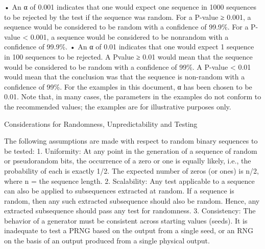 • An α of 0.001 indicates that one would expect one sequence in 1000 sequences to be rejected by the test if the sequence was random. For a P-value ≥ 0.001, a sequence would be considered to be random with a confidence of 99.9\%. For a P-value < 0.001, a sequence would be considered to be nonrandom with a confidence of 99.9\%.
• An α of 0.01 indicates that one would expect 1 sequence in 100 sequences to be rejected. A Pvalue ≥ 0.01 would mean that the sequence would be considered to be random with a confidence of 99\%. A P-value < 0.01 would mean that the conclusion was that the sequence is non-random with a confidence of 99\%.
For the examples in this document, α has been chosen to be 0.01. Note that, in many cases, the parameters in the examples do not conform to the recommended values; the examples are for illustrative purposes only. 

Considerations for Randomness, Unpredictability and Testing

The following assumptions are made with respect to random binary sequences to be tested:
1.	 Uniformity: At any point in the generation of a sequence of random or pseudorandom bits, the occurrence of a zero or one is equally likely, i.e., the probability of each is exactly 1/2. The expected number of zeros (or ones) is n/2, where n = the sequence length.
2.	 Scalability: Any test applicable to a sequence can also be applied to subsequences extracted at random. If a sequence is random, then any such extracted subsequence should also be random. Hence, any extracted subsequence should pass any test for randomness.
3.	 Consistency: The behavior of a generator must be consistent across starting values (seeds). It is inadequate to test a PRNG based on the output from a single seed, or an RNG on the basis of an output produced from a single physical output. 